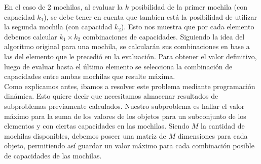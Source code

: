 
  En el caso de 2 mochilas, al evaluar la $k$ posibilidad de la primer mochila (con capacidad $k_{1}$), se debe tener en cuenta que tambien está la posibilidad de utilizar la segunda mochila (con capacidad $k_{2}$). Esto nos muestra que por cada elemento debemos calcular $k_{1} \times k_{2}$ combinaciones de capacidades. Siguiendo la idea del algoritmo original para una mochila, se calcularán sus combinaciones en base a las del elemento que le precedió en la evaluación. Para obtener el valor definitivo, luego de evaluar hasta el último elemento se selecciona la combinación de capacidades entre ambas mochilas que resulte máxima.\\
 
Como explicamos antes, ibamos a resolver este problema mediante programación dinámica. Esto quiere decir que necesitamos almacenar resultados de subproblemas previamente calculados. Nuestro subproblema es hallar el valor m\'aximo para la suma de los valores de los objetos para un subconjunto de los elementos y con ciertas capacidades en las mochilas.
Siendo $M$ la cantidad de mochilas disponibles, debemos poseer una matriz de $M$ dimensiones para cada objeto, permitiendo así guardar un valor máximo para cada combinación posible de capacidades de las mochilas.

